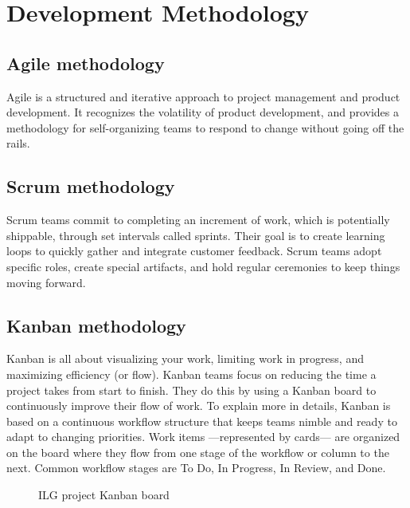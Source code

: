 \newpage

\section{Development Methodology}
\subsection{Agile methodology}
Agile is a structured and iterative approach to project management and product development. It recognizes the volatility of product development, and provides a methodology for self-organizing teams to respond to change without going off the rails.

\subsection{Scrum methodology}
Scrum teams commit to completing an increment of work, which is potentially shippable, through set intervals called sprints. Their goal is to create learning loops to quickly gather and integrate customer feedback. Scrum teams adopt specific roles, create special artifacts, and hold regular ceremonies to keep things moving forward.

\subsection{Kanban methodology}
Kanban is all about visualizing your work, limiting work in progress, and maximizing efficiency (or flow). Kanban teams focus on reducing the time a project takes from start to finish. They do this by using a Kanban board to continuously improve their flow of work. To explain more in details, Kanban is based on a continuous workflow structure that keeps teams nimble and ready to adapt to changing priorities. Work items —represented by cards— are organized on the board where they flow from one stage of the workflow or column to the next. Common workflow stages are To Do, In Progress, In Review, and Done.

\begin{figure}[H]
    \centering
    \caption{ILG project Kanban board}
    \label{fig:ilg-project-kanban-board}
\end{figure}

